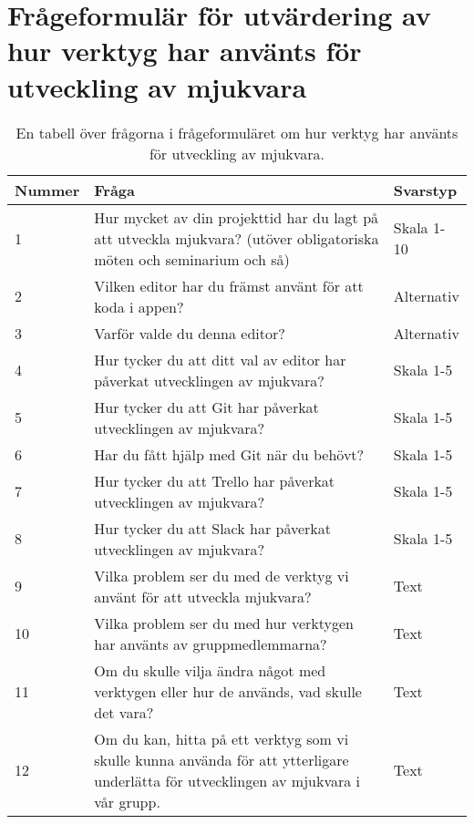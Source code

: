 \chapter{\hspace{2.6em} Frågeformulär för utvärdering av hur verktyg har använts för utveckling av mjukvara}
\label{cha:verktyg_enkat_fragor}

\begin{table}[h!]
  \centering
  \caption{En tabell över frågorna i frågeformuläret om hur verktyg har använts för utveckling av mjukvara.}
  \def\arraystretch{1.5}
  \begin{adjustbox}{max width=\textwidth}
    \begin{tabularx}{\textwidth}{ | l | X | l |}
      \hline
      \textbf{Nummer} & \textbf{Fråga} & \textbf{Svarstyp} \\
      \hline
      1 & Hur mycket av din projekttid har du lagt på att utveckla mjukvara? (utöver obligatoriska möten och seminarium och så) & Skala 1-10 \\
      \hline
      2 & Vilken editor har du främst använt för att koda i appen? & Alternativ \\
      \hline 
      3 & Varför valde du denna editor? & Alternativ \\
      \hline
      4 & Hur tycker du att ditt val av editor har påverkat utvecklingen av mjukvara? & Skala 1-5 \\
      \hline
      5 & Hur tycker du att Git har påverkat utvecklingen av mjukvara? & Skala 1-5 \\
      \hline
      6 & Har du fått hjälp med Git när du behövt? & Skala 1-5 \\
      \hline
      7 & Hur tycker du att Trello har påverkat utvecklingen av mjukvara? & Skala 1-5 \\
      \hline
      8 & Hur tycker du att Slack har påverkat utvecklingen av mjukvara? & Skala 1-5 \\
      \hline
      9 & Vilka problem ser du med de verktyg vi använt för att utveckla mjukvara? & Text \\
      \hline
      10 & Vilka problem ser du med hur verktygen har använts av gruppmedlemmarna? & Text \\
      \hline
      11 & Om du skulle vilja ändra något med verktygen eller hur de används, vad skulle det vara? & Text \\
      \hline
      12 & Om du kan, hitta på ett verktyg som vi skulle kunna använda för att ytterligare underlätta för utvecklingen av mjukvara i vår grupp. & Text \\
      \hline
    \end{tabularx}
  \end{adjustbox}
\end{table}

